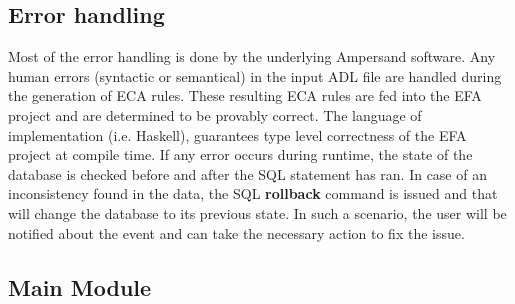 \documentclass[12pt, svgnames]{article}
\begin{document}
\subsection{Error handling}
Most of the error handling is done by the underlying Ampersand software. Any 
human errors (syntactic or semantical) in the input ADL file are handled during 
the generation of ECA rules. These resulting ECA rules are fed into the EFA 
project and are determined to be provably correct.  The 
language of implementation (i.e. Haskell), 
guarantees type level correctness of the EFA project at compile time. 
\newline
If any error occurs during runtime, the state of the database is checked 
before and after the SQL statement has ran. In case of an inconsistency found 
in the data, the SQL \textbf{rollback} command is issued and that will change 
the database to its previous state. In such a scenario, the user will be 
notified about the event and can take the necessary action to fix the issue. 

\subsection{Main Module}
\end{document}
